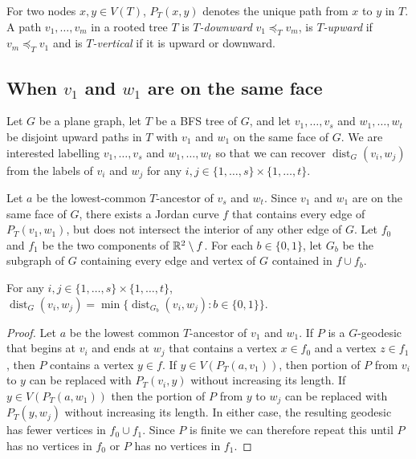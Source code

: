 \documentclass{patmorin}
\DeclareMathOperator{\dist}{dist}
\DeclareMathOperator{\depth}{depth}
\newcommand{\comparable}{\mathbin{\diamond}}
\begin{document}
For two nodes $x,y\in V(T)$, $P_T(x,y)$ denotes the unique path from $x$ to $y$ in $T$.  A path $v_1,\ldots,v_{m}$ in a rooted tree $T$ is \emph{$T$-downward} $v_1\preceq_T v_m$, is \emph{$T$-upward} if $v_m\preceq_T v_1$ and is \emph{$T$-vertical} if it is upward or downward.



\subsection{When $v_1$ and $w_1$ are on the same face}

Let $G$ be a plane graph, let $T$ be a BFS tree of $G$, and let $v_1,\ldots,v_s$ and $w_1,\ldots,w_t$ be disjoint upward paths in $T$ with $v_1$ and $w_1$ on the same face of $G$.  We are interested labelling $v_1,\ldots,v_s$ and $w_1,\ldots,w_t$ so that we can recover $\dist_G(v_i,w_j)$ from the labels of $v_i$ and $w_j$ for any $i,j\in\{1,\ldots,s\}\times\{1,\ldots,t\}$.


%

Let $a$ be the lowest-common $T$-ancestor of $v_s$ and $w_t$.  Since $v_1$ and $w_1$ are on the same face of $G$, there exists a Jordan curve $f$ that contains every edge of $P_T(v_1,w_1)$, but does not intersect the interior of any other edge of $G$.  Let $f_0$ and $f_1$ be the two components of $\mathbb{R}^2\setminus f$.  For each $b\in\{0,1\}$, let $G_b$ be the subgraph of $G$ containing every edge and vertex of $G$ contained in $f\cup f_b$.

\begin{obs}\label{in_out}
    For any $i,j\in\{1,\ldots,s\}\times\{1,\ldots,t\}$,  $\dist_G(v_i,w_j)=\min\{\dist_{G_b}(v_i,w_j): b\in\{0,1\}\}$.
\end{obs}

\begin{proof}
    Let $a$ be the lowest common $T$-ancestor of $v_1$ and $w_1$. If $P$ is a $G$-geodesic that begins at $v_i$ and ends at $w_j$ that contains a vertex $x\in f_0$ and a vertex $z\in f_1$, then $P$ contains a vertex $y\in f$.  If $y\in V(P_T(a,v_1))$, then portion of $P$ from $v_i$ to $y$ can be replaced with $P_T(v_i,y)$ without increasing its length.  If $y\in V(P_T(a,w_1))$ then the portion of $P$ from $y$ to $w_j$ can be replaced with $P_T(y,w_j)$ without increasing its length.  In either case, the resulting geodesic has fewer vertices in $f_0\cup f_1$. Since $P$ is finite we can therefore repeat this until $P$ has no vertices in $f_0$ or $P$ has no vertices in $f_1$.
\end{proof}
\end{document}

